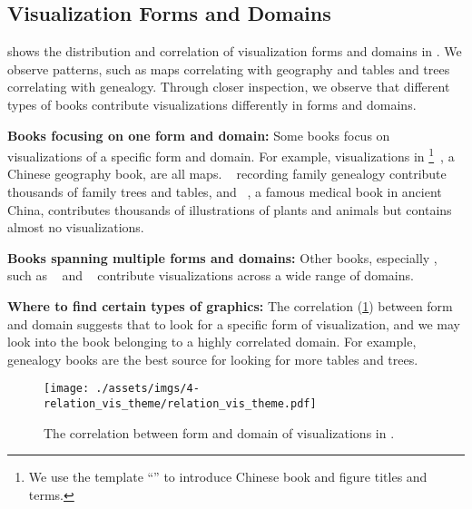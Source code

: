 \subsection{Visualization Forms and Domains}
\label{sec:dataset-sample}

 shows the distribution and correlation of visualization forms and domains in \datasetName.
We observe patterns, such as maps correlating with geography and tables and trees correlating with genealogy.
Through closer inspection, we observe that different types of books contribute visualizations differently in forms and domains.


\textbf{Books focusing on one form and domain:}
Some books focus on visualizations of a specific form and domain.
For example, visualizations in \footnote{
We use the template ``'' to introduce Chinese book and figure titles and terms.
}~\cite{Lu16621722Guang}, a Chinese geography book, are all maps.
~\cite{Qin1873Dongting} recording family genealogy contribute thousands of family trees and tables, and ~\cite{Li1655Ben}, a famous medical book in ancient China, contributes thousands of illustrations of plants and animals but contains almost no visualizations.

\textbf{Books spanning multiple forms and domains:}
Other books, especially , such as ~\cite{Du1827Si} and ~\cite{Hu1403Si} contribute visualizations across a wide range of domains.

 
\textbf{Where to find certain types of graphics:}
The correlation (\cref{fig:relation-matrix}) between form and domain suggests that to look for a specific form of visualization, and we may look into the book belonging to a highly correlated domain.
For example, genealogy books are the best source for looking for more tables and trees.



\begin{figure}[!htb]
    \centering
    \texttt{[image: ./assets/imgs/4-relation\_vis\_theme/relation\_vis\_theme.pdf]}
    \caption{
        The correlation between form and domain of visualizations in \datasetName.
    }
    \label{fig:relation-matrix}
\end{figure}


